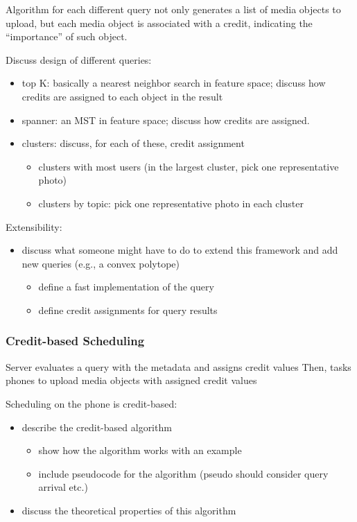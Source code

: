 \documentclass[10pt]{article}
\begin{document}
Algorithm for each different query not only generates a list of media
objects to upload, but each media object is associated with a credit,
indicating the “importance” of such object.

Discuss design of different queries:
\begin{itemize}
\item top K: basically a nearest neighbor search in feature space;
  discuss how credits are assigned to each object in the result
\item spanner: an MST in feature space; discuss how credits are assigned.
\item clusters: discuss, for each of these, credit assignment
\begin{itemize}
\item clusters with most users (in the largest cluster, pick one
    representative photo)
\item clusters by topic: pick one representative photo in each cluster
\end{itemize}
\end{itemize}

Extensibility:
\begin{itemize}
\item discuss what someone might have to do to extend this framework and
  add new queries (e.g., a convex polytope)
\begin{itemize}
\item define a fast implementation of the query
\item define credit assignments for query results
\end{itemize}
\end{itemize}
\subsubsection{Credit-based Scheduling}
\label{sec-3-2-2}


Server evaluates a query with the metadata and assigns credit values
Then, tasks phones to upload media objects with assigned credit values

Scheduling on the phone is credit-based:
\begin{itemize}
\item describe the credit-based algorithm
\begin{itemize}
\item show how the algorithm works with an example
\item include pseudocode for the algorithm (pseudo should consider query
    arrival etc.)
\end{itemize}
\item discuss the theoretical properties of this algorithm
\end{itemize}
\end{document}
